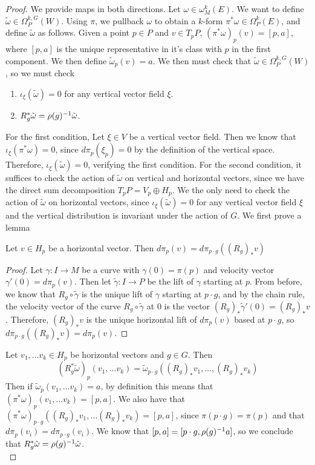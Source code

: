 \begin{proof}
We provide maps in both directions. Let $\omega \in \omega_M^k(E)$. We want to define
$\widetilde{\omega} \in \Omega_P^{k,G}(W)$. Using $\pi$, we pullback
$\omega$ to obtain a $k$-form $\pi^*\omega \in \Omega_P^k(E)$, and define
$\tilde{\omega}$ as follows. Given a point $p \in P$ and $v \in T_pP$,
$(\pi^*\omega)_p(v) = [p, a]$, where $[p,a]$ is the unique representative in
it's class with $p$ in the first component. We then define
$\tilde{\omega}_p(v) = a$. We then must check that
$\tilde{\omega} \in \Omega^{k,G}_P(W)$, so we must check
\begin{enumerate}
  \item $\iota_{\xi}(\tilde{\omega}) = 0$ for any vertical vector field $\xi$.
  \item $R_g^*\tilde{\omega} = \rho(g)^{-1}\tilde{\omega}$.
\end{enumerate}
For the first condition, Let $\xi \in V$ be a vertical vector field. Then we know that
$\iota_{\xi}(\pi^*\omega)= 0$, since $d\pi_p(\xi_p) = 0$ by the definition of the
vertical space. Therefore, $\iota_{\xi}(\tilde{\omega}) = 0$, verifying the
first condition. For the second condition, it suffices to check the action of
$\tilde{\omega}$ on vertical and horizontal vectors, since we have the direct
sum decomposition $T_pP = V_p \oplus H_p$. We the only need to check the action
of $\tilde{\omega}$ on horizontal vectors, since $\iota_\xi({\tilde{\omega}}) = 0$
for any vertical vector field $\xi$ and the vertical distribution is invariant
under the action of $G$. We first prove a lemma
%
\begin{lem*}
Let $v \in H_p$ be a horizontal vector. Then
$d\pi_p(v) = d\pi_{p \cdot g}((R_g)_*v)$
\end{lem*}
%
\begin{proof}
Let $\gamma : I \to M$ be a curve with $\gamma(0) = \pi(p)$ and velocity vector
$\gamma'(0) = d\pi_p(v)$. Then let $\tilde{\gamma} : I \to P$ be the lift of
$\gamma$ starting at $p$. From before, we know that $R_g \circ \tilde{\gamma}$
is the unique lift of $\gamma$ starting at $p \cdot g$, and by the chain rule,
the velocity vector of the curve $R_g \circ \tilde{\gamma}$ at $0$ is the vector
$(R_g)_*\tilde{\gamma}'(0) = (R_g)_*v$. Therefore, $(R_g)_*v$ is the unique
horizontal lift of $d\pi_p(v)$ based at $p \cdot g$, so
$d\pi_{p \cdot g}((R_g)_*v) = d\pi_p(v)$.
\end{proof}
%
Let $v_1, \ldots v_k \in H_p$ be horizontal vectors and $g \in G$. Then
\[
(R_g^*\tilde{\omega})_p(v_1,\ldots v_k) =
\tilde{\omega}_{p \cdot g}((R_g)_*v_1, \ldots , (R_g)_* v_k)
\]
Then if $\tilde{\omega}_p(v_1, \ldots v_k) = a$, by definition this means that
$(\pi^*\omega)_p(v_1, \ldots v_k) = [p,a]$. We also have that
$(\pi^*\omega)_{p\cdot g}((R_g)_*v_1,\ldots (R_g)_*v_k) = [p,a]$, since
$\pi(p \cdot g) = \pi(p)$ and that $d\pi_p(v_i) = d\pi_{p \cdot g}(v_i)$.
We know that $[p,a] = [p \cdot g, \rho(g)^{-1} a]$, so we conclude that
$R_g^*\tilde{\omega} = \rho(g)^{-1}\tilde{\omega}$.\\


\end{proof}
